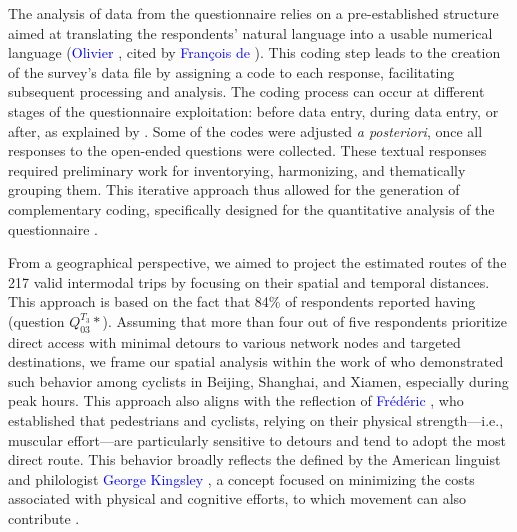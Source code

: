 \begin{refsegment}
The analysis of data from the questionnaire relies on a pre-established structure aimed at translating the respondents' natural language into a usable numerical language (\textcolor{blue}{Olivier} \textcolor{blue}{\textcite[49-62]{martin_analyse_2020}}, cited by \textcolor{blue}{François de} \textcolor{blue}{\textcite[89]{singly_questionnaire_2016}}). This coding step leads to the creation of the survey's data file by assigning a code to each response, facilitating subsequent processing and analysis. The coding process can occur at different stages of the questionnaire exploitation: before data entry, during data entry, or after, as explained by \textcolor{blue}{\textcite{ined_saisie_nodate}}. Some of the codes were adjusted \textsl{a posteriori}, once all responses to the open-ended questions were collected. These textual responses required preliminary work for inventorying, harmonizing, and thematically grouping them. This iterative approach thus allowed for the generation of complementary coding, specifically designed for the quantitative analysis of the questionnaire \textcolor{blue}{\autocite[89]{singly_questionnaire_2016}}.%

From a geographical perspective, we aimed to project the estimated routes of the 217 valid intermodal trips by focusing on their spatial and temporal distances. This approach is based on the fact that 84\% of respondents reported having  (question \(Q_{03}^{T_{3}}*\)). Assuming that more than four out of five respondents prioritize direct access with minimal detours to various network nodes and targeted destinations, we frame our spatial analysis within the work of \textcolor{blue}{\textcite[2, 7]{qiu_understanding_2022}} who demonstrated such behavior among cyclists in Beijing, Shanghai, and Xiamen, especially during peak hours. This approach also aligns with the reflection of \textcolor{blue}{Frédéric} \textcolor{blue}{\textcite[115]{heran_distances_2009}}, who established that pedestrians and cyclists, relying on their physical strength—i.e., muscular effort—are particularly sensitive to detours and tend to adopt the most direct route. This behavior broadly reflects the  defined by the American linguist and philologist \textcolor{blue}{George Kingsley} \textcolor{blue}{\textcite[348]{zipf_human_1949}}, a concept focused on minimizing the costs associated with physical and cognitive efforts, to which movement can also contribute \textcolor{blue}{\autocite[348]{zhu_principle_2018}}.%


\end{refsegment}
